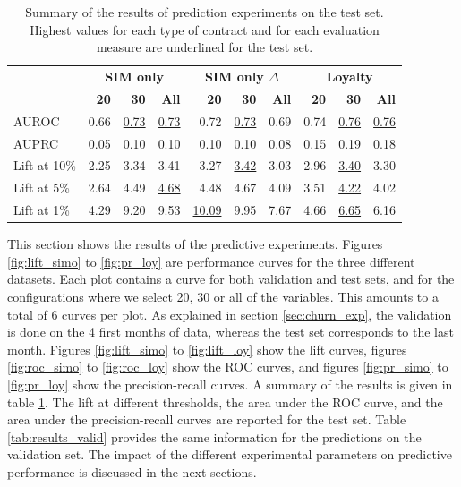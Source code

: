 \begin{table}
    \centering
    \begin{tabular}{lrrrrrrrrr}
        \toprule
        & \multicolumn{3}{c}{\textbf{SIM only}}
        & \multicolumn{3}{c}{\textbf{SIM only $\Delta$}}
        & \multicolumn{3}{c}{\textbf{Loyalty}} \\
        \cmidrule(l){2-4} \cmidrule(l){5-7} \cmidrule(l){8-10}
        & \textbf{20} & \textbf{30} & \textbf{All} & \textbf{20} & \textbf{30} &
        \textbf{All} & \textbf{20} & \textbf{30} & \textbf{All} \\
        \midrule

        AUROC        & 0.66 & \underline{0.73} & \underline{0.73} & 0.72 &
        \underline{0.73} & 0.69 & 0.74 & \underline{0.76} & \underline{0.76} \\

        AUPRC        & 0.05 & \underline{0.10} & \underline{0.10} &
        \underline{0.10} & \underline{0.10} & 0.08 & 0.15 & \underline{0.19} & 0.18 \\

        Lift at 10\% & 2.25 & 3.34 & 3.41 & 3.27 & \underline{3.42} & 3.03 &
        2.96 & \underline{3.40} & 3.30 \\

        Lift at 5\%  & 2.64 & 4.49 & \underline{4.68} & 4.48 & 4.67 & 4.09 &
        3.51 & \underline{4.22} & 4.02 \\

        Lift at 1\%  & 4.29 & 9.20 & 9.53 & \underline{10.09} & 9.95 & 7.67 &
        4.66 & \underline{6.65} & 6.16 \\
        \bottomrule
    \end{tabular}
    \caption{Summary of the results of prediction experiments on the test set.
    Highest values for each type of contract and for each evaluation measure are
    underlined for the test set.}
    \label{tab:results}
\end{table}

This section shows the results of the predictive experiments. Figures
\ref{fig:lift_simo} to \ref{fig:pr_loy} are performance curves for the three
different datasets. Each plot contains a curve for both validation and test
sets, and for the configurations where we select 20, 30 or all of the variables.
This amounts to a total of 6 curves per plot. As explained in section
\ref{sec:churn_exp}, the validation is done on the 4 first months of data,
whereas the test set corresponds to the last month. Figures \ref{fig:lift_simo}
to \ref{fig:lift_loy} show the lift curves, figures \ref{fig:roc_simo} to
\ref{fig:roc_loy} show the ROC curves, and figures \ref{fig:pr_simo} to
\ref{fig:pr_loy} show the precision-recall curves. A summary of the results is
given in table \ref{tab:results}. The lift at different thresholds, the area
under the ROC curve, and the area under the precision-recall curves are reported
for the test set. Table \ref{tab:results_valid} provides the same information
for the predictions on the validation set. The impact of the different
experimental parameters on predictive performance is discussed in the next
sections.

